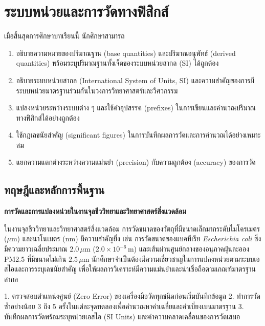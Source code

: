\chapter{ระบบหน่วยและการวัดทางฟิสิกส์}
\label{ch:ch01_units_measurement}

\begin{conceptbox}[title=วัตถุประสงค์การเรียนรู้ประจำบท]
เมื่อสิ้นสุดการศึกษาบทเรียนนี้ นักศึกษาสามารถ
\begin{enumerate}
    \item อธิบายความหมายของปริมาณฐาน (base quantities) และปริมาณอนุพัทธ์ (derived quantities) พร้อมระบุปริมาณฐานทั้งเจ็ดของระบบหน่วยสากล (SI) ได้ถูกต้อง
    \item อธิบายระบบหน่วยสากล (International System of Units, SI) และความสำคัญของการมีระบบหน่วยมาตรฐานร่วมกันในวงการวิทยาศาสตร์และวิศวกรรม
    \item แปลงหน่วยระหว่างระบบต่าง ๆ และใช้คำอุปสรรค (prefixes) ในการเขียนและคำนวณปริมาณทางฟิสิกส์ได้อย่างถูกต้อง
    \item ใช้กฎเลขนัยสำคัญ (significant figures) ในการบันทึกผลการวัดและการคำนวณได้อย่างเหมาะสม
    \item แยกความแตกต่างระหว่างความแม่นยำ (precision) กับความถูกต้อง (accuracy) ของการวัด
\end{enumerate}
\end{conceptbox}

\section{ทฤษฎีและหลักการพื้นฐาน}

\begin{bioappbox}
\textbf{การวัดและการแปลงหน่วยในงานจุลชีววิทยาและวิทยาศาสตร์สิ่งแวดล้อม}

ในงานจุลชีววิทยาและวิทยาศาสตร์สิ่งแวดล้อม การวัดขนาดของวัตถุที่มีขนาดเล็กมากระดับไมโครเมตร ($\mu\text{m}$) และนาโนเมตร ($\text{nm}$) มีความสำคัญยิ่ง เช่น การวัดขนาดของแบคทีเรีย \textit{Escherichia coli} ซึ่งมีความยาวเฉลี่ยประมาณ $2.0\,\mu\text{m}$ ($2.0 \times 10^{-6}\,\text{m}$) และเส้นผ่านศูนย์กลางของอนุภาคฝุ่นละออง PM2.5 ที่มีขนาดไม่เกิน $2.5\,\mu\text{m}$ นักศึกษาจำเป็นต้องมีความเชี่ยวชาญในการแปลงหน่วยตามระบบเอสไอและการระบุเลขนัยสำคัญ เพื่อให้ผลการวิเคราะห์มีความแม่นยำและน่าเชื่อถือตามเกณฑ์มาตรฐานสากล
\end{bioappbox}

\begin{labbox}
1. ตรวจสอบตำแหน่งศูนย์ (Zero Error) ของเครื่องมือวัดทุกชนิดก่อนเริ่มบันทึกข้อมูล
2. ทำการวัดซ้ำอย่างน้อย 3 ถึง 5 ครั้งในแต่ละจุดทดลองเพื่อคำนวณหาค่าเฉลี่ยและค่าเบี่ยงเบนมาตรฐาน
3. บันทึกผลการวัดพร้อมระบุหน่วยเอสไอ (SI Units) และค่าความคลาดเคลื่อนของการวัดเสมอ
\end{labbox}

